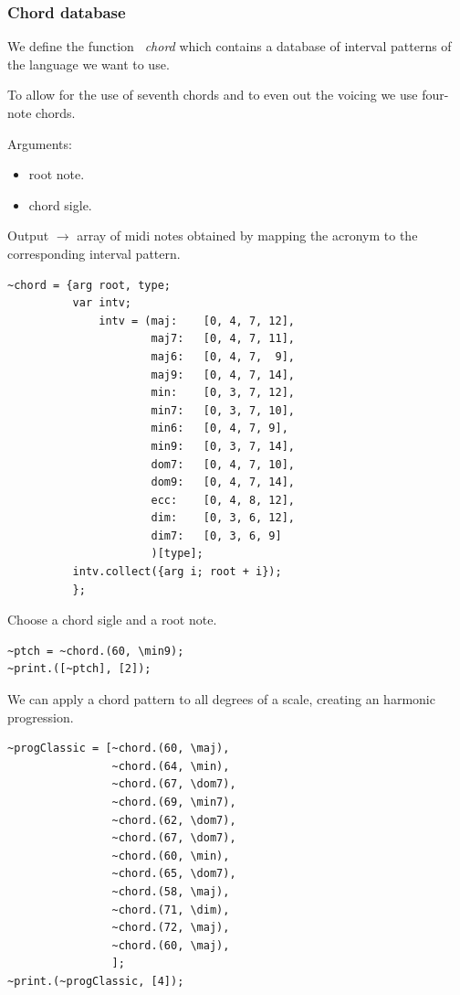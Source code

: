 \subsubsection{Chord database}\label{chord-database}

We define the function \textit{~chord} which contains a database of interval patterns of the language we want to use.

To allow for the use of seventh chords and to even out the voicing we use four-note chords.

Arguments:
\begin{itemize}
\tightlist
\item root note.
\item chord sigle.
\end{itemize}

Output \(\rightarrow\) array of midi notes obtained by mapping the acronym to the corresponding interval pattern.

\begin{lstlisting}[frame=single, caption=chord model function] 
~chord = {arg root, type;
          var intv;
              intv = (maj:    [0, 4, 7, 12],
                      maj7:   [0, 4, 7, 11],
                      maj6:   [0, 4, 7,  9],
                      maj9:   [0, 4, 7, 14],
                      min:    [0, 3, 7, 12],
                      min7:   [0, 3, 7, 10],
                      min6:   [0, 4, 7, 9],
                      min9:   [0, 3, 7, 14],
                      dom7:   [0, 4, 7, 10],
                      dom9:   [0, 4, 7, 14],
                      ecc:    [0, 4, 8, 12],
                      dim:    [0, 3, 6, 12],
                      dim7:   [0, 3, 6, 9]
                      )[type];
          intv.collect({arg i; root + i});
          };
\end{lstlisting}

Choose a chord sigle and a root note.

\begin{lstlisting}[frame=single] 
~ptch = ~chord.(60, \min9);
~print.([~ptch], [2]);
\end{lstlisting}

We can apply a chord pattern to all degrees of a scale, creating an harmonic progression.

\begin{lstlisting}[frame=single] 
~progClassic = [~chord.(60, \maj),
                ~chord.(64, \min),
                ~chord.(67, \dom7),
                ~chord.(69, \min7),
                ~chord.(62, \dom7),
                ~chord.(67, \dom7),
                ~chord.(60, \min),
                ~chord.(65, \dom7),
                ~chord.(58, \maj),
                ~chord.(71, \dim),
                ~chord.(72, \maj),
                ~chord.(60, \maj),
                ];
~print.(~progClassic, [4]);
\end{lstlisting}

